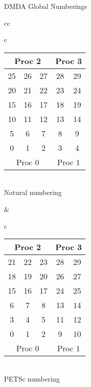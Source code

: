 \begin{frame}{DMDA Global Numberings}

\begin{center}
\begin{tabular}{cc}
\begin{tabular}{c}
\begin{tabular}{|ccc|cc|}
\hline
\multicolumn{3}{|c|}{Proc 2} & \multicolumn{2}{c|}{Proc 3} \\
\hline
25 & 26 & 27 & 28 & 29 \\
20 & 21 & 22 & 23 & 24 \\
15 & 16 & 17 & 18 & 19 \\
\hline
10 & 11 & 12 & 13 & 14 \\
 5 &  6 &  7 &  8 &  9 \\
 0 &  1 &  2 &  3 &  4 \\
\hline
\multicolumn{3}{|c|}{Proc 0} & \multicolumn{2}{c|}{Proc 1} \\
\hline
\end{tabular} \\
Natural numbering
\end{tabular}
& 
\begin{tabular}{c}
\begin{tabular}{|ccc|cc|}
\hline
\multicolumn{3}{|c|}{Proc 2} & \multicolumn{2}{c|}{Proc 3} \\
\hline
21 & 22 & 23 & 28 & 29 \\
18 & 19 & 20 & 26 & 27 \\
15 & 16 & 17 & 24 & 25 \\
\hline
 6 &  7 &  8 & 13 & 14 \\
 3 &  4 &  5 & 11 & 12 \\
 0 &  1 &  2 &  9 & 10 \\
\hline
\multicolumn{3}{|c|}{Proc 0} & \multicolumn{2}{c|}{Proc 1} \\
\hline
\end{tabular}\\
PETSc numbering
\end{tabular}
\end{tabular}
\end{center}
\end{frame}
